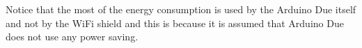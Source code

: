 Notice that the most of the energy consumption is used by the Arduino Due itself and not by the WiFi shield and this is because it is assumed that Arduino Due does not use any power saving.



